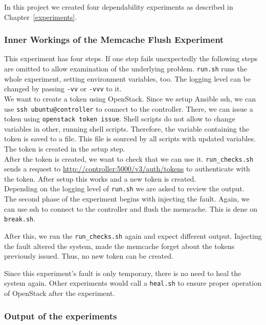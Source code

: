\begin{appendix}
In this project we created four dependability experiments as described in Chapter~\ref{experiments}.

\subsubsection{Inner Workings of the Memcache Flush Experiment}
\label{a:memcache}

This experiment has four steps. If one step fails unexpectedly the following steps are omitted to allow examination of the underlying problem. \texttt{run.sh} runs the whole experiment, setting environment variables, too. The logging level can be changed by passing \texttt{-vv} or \texttt{-vvv} to it.\\

We want to create a token using OpenStack. Since we setup Ansible ssh, we can use \texttt{ssh ubuntu@controller} to connect to the controller. There, we can issue a token using \texttt{openstack token issue}. Shell scripts do not allow to change variables in other, running shell scripts. Therefore, the variable containing the token is saved to a file. This file is sourced by all scripts with updated variables. The token is created in the setup step.\\

After the token is created, we want to check that we can use it. \texttt{run\_checks.sh} sends a request to \url{http://controller:5000/v3/auth/tokens} to authenticate with the token. After setup this works and a new token is created.\\

Depending on the logging level of \texttt{run.sh} we are asked to review the output. \\

The second phase of the experiment begins with injecting the fault. 
Again, we can use ssh to connect to the controller and flush the memcache. This is dene on \texttt{break.sh}.

After this, we run the \texttt{run\_checks.sh} again and expect different output. Injecting the fault altered the system, made the memcache forget about the tokens previously issued. Thus, no new token can be created.

Since this experiment's fault is only temporary, there is no need to heal the system again. Other experiments would call a \texttt{heal.sh} to ensure proper operation of OpenStack after the experiment.

\subsubsection{Output of the experiments}


\end{appendix}
